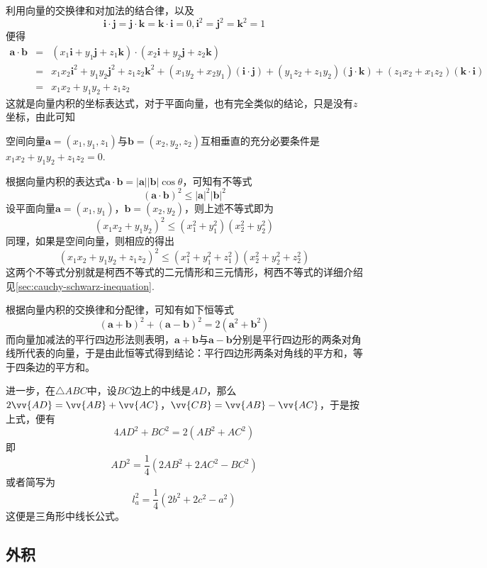 利用向量的交换律和对加法的结合律，以及
\[ \bm{i} \cdot \bm{j} = \bm{j} \cdot \bm{k} = \bm{k} \cdot \bm{i} = 0, \bm{i}^2 = \bm{j}^2 = \bm{k}^2=1 \]
便得
\begin{eqnarray*}
  \bm{a} \cdot \bm{b} & = & (x_1 \bm{i} + y_1 \bm{j} + z_1 \bm{k}) \cdot (x_2 \bm{i} + y_2 \bm{j} + z_2 \bm{k}) \\
                      & = & x_1x_2 \bm{i}^2 + y_1y_2 \bm{j}^2 + z_1z_2 \bm{k}^2 + (x_1y_2+x_2y_1)(\bm{i} \cdot \bm{j}) + (y_1z_2+z_1y_2)(\bm{j} \cdot \bm{k}) + (z_1x_2 + x_1z_2)(\bm{k} \cdot \bm{i}) \\
  & = & x_1x_2 + y_1y_2+z_1z_2
\end{eqnarray*}
这就是向量内积的坐标表达式，对于平面向量，也有完全类似的结论，只是没有$z$坐标，由此可知

\begin{theorem}
  空间向量$\bm{a}=(x_1,y_1,z_1)$与$\bm{b} = (x_2,y_2,z_2)$互相垂直的充分必要条件是$x_1x_2+y_1y_2+z_1z_2=0$.
\end{theorem}

根据向量内积的表达式$\bm{a}\cdot\bm{b}=|\bm{a}||\bm{b}|\cos{\theta}$，可知有不等式
\[ (\bm{a}\cdot\bm{b})^2 \leqslant |\bm{a}|^2 |\bm{b}|^2 \]
设平面向量$\bm{a}=(x_1,y_1)$，$\bm{b}=(x_2,y_2)$，则上述不等式即为
\[ (x_1x_2+y_1y_2)^2 \leqslant (x_1^2+y_1^2)(x_2^2+y_2^2) \]
同理，如果是空间向量，则相应的得出
\[ (x_1x_2+y_1y_2+z_1z_2)^2 \leqslant (x_1^2+y_1^2+z_1^2)(x_2^2+y_2^2+z_2^2) \]
这两个不等式分别就是柯西不等式的二元情形和三元情形，柯西不等式的详细介绍见\autoref{sec:cauchy-schwarz-inequation}.

\begin{example}
  根据向量内积的交换律和分配律，可知有如下恒等式
  \[ (\bm{a}+\bm{b})^2 + (\bm{a}-\bm{b})^2 = 2(\bm{a}^2+\bm{b}^2) \]
而向量加减法的平行四边形法则表明，$\bm{a+b}$与$\bm{a-b}$分别是平行四边形的两条对角线所代表的向量，于是由此恒等式得到结论：平行四边形两条对角线的平方和，等于四条边的平方和。

进一步，在$\triangle ABC$中，设$BC$边上的中线是$AD$，那么$2\vv{AD}=\vv{AB}+\vv{AC}$，$\vv{CB}=\vv{AB}-\vv{AC}$，于是按上式，便有
\[ 4AD^2+BC^2=2(AB^2+AC^2) \]
即
\[ AD^2 = \frac{1}{4}(2AB^2+2AC^2-BC^2) \]
或者简写为
\[ l_a^2 = \frac{1}{4}(2b^2+2c^2-a^2) \]
这便是三角形中线长公式。
\end{example}


\subsection{外积}
\label{sec:outer-product-of-vectors}

